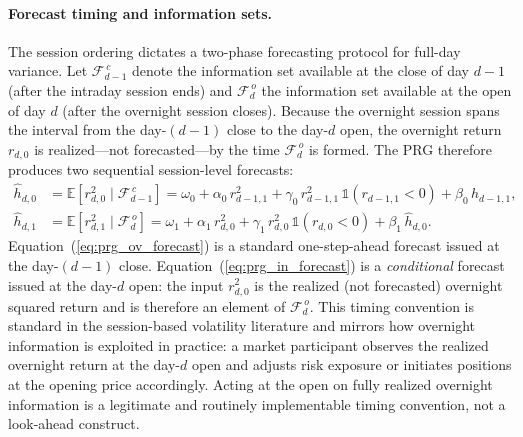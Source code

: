 \documentclass[11pt,a4paper]{article}
\begin{document}
\paragraph{Forecast timing and information sets.}
The session ordering dictates a two-phase forecasting protocol for full-day variance. Let $\mathcal{F}_{d-1}^{\,c}$ denote the information set available at the close of day $d-1$ (after the intraday session ends) and $\mathcal{F}_{d}^{\,o}$ the information set available at the open of day $d$ (after the overnight session closes). Because the overnight session spans the interval from the day-$(d-1)$ close to the day-$d$ open, the overnight return $r_{d,0}$ is realized---not forecasted---by the time $\mathcal{F}_{d}^{\,o}$ is formed. The PRG therefore produces two sequential session-level forecasts:
\begin{align}
    \hat{h}_{d,0} &= \mathbb{E}\!\left[r^2_{d,0} \mid \mathcal{F}_{d-1}^{\,c}\right]
    = \omega_{0} + \alpha_{0}\, r^2_{d-1,1} + \gamma_{0}\, r^2_{d-1,1}\, \mathbb{1}(r_{d-1,1} < 0) + \beta_{0}\, h_{d-1,1},
    \label{eq:prg_ov_forecast} \\[2pt]
    \hat{h}_{d,1} &= \mathbb{E}\!\left[r^2_{d,1} \mid \mathcal{F}_{d}^{\,o}\right]
    = \omega_{1} + \alpha_{1}\, r^2_{d,0} + \gamma_{1}\, r^2_{d,0}\, \mathbb{1}(r_{d,0} < 0) + \beta_{1}\, \hat{h}_{d,0}.
    \label{eq:prg_in_forecast}
\end{align}
Equation~(\ref{eq:prg_ov_forecast}) is a standard one-step-ahead forecast issued at the day-$(d-1)$ close. Equation~(\ref{eq:prg_in_forecast}) is a \emph{conditional} forecast issued at the day-$d$ open: the input $r^2_{d,0}$ is the realized (not forecasted) overnight squared return and is therefore an element of $\mathcal{F}_{d}^{\,o}$. This timing convention is standard in the session-based volatility literature \citep{Linton2020,Opschoor2021} and mirrors how overnight information is exploited in practice: a market participant observes the realized overnight return at the day-$d$ open and adjusts risk exposure or initiates positions at the opening price accordingly. Acting at the open on fully realized overnight information is a legitimate and routinely implementable timing convention, not a look-ahead construct.
\end{document}
